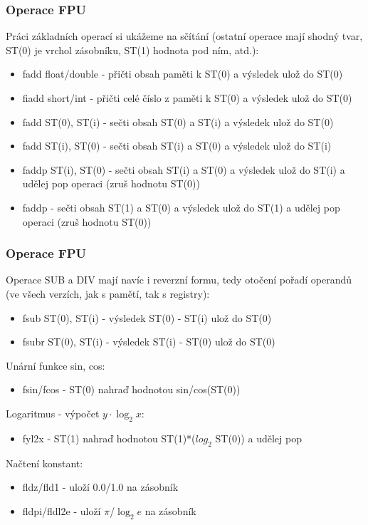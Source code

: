 \documentclass{beamer}
\begin{document}
\begin{frame}
\frametitle{Operace FPU}
Práci základních operací si ukážeme na sčítání (ostatní operace mají shodný tvar, ST(0) je vrchol zásobníku, ST(1) hodnota pod ním, atd.):
\begin{itemize}
\item fadd float/double - přičti obsah paměti k ST(0) a výsledek ulož do ST(0)
\item fiadd short/int - přičti celé číslo z paměti k ST(0) a výsledek ulož do ST(0)
\item fadd ST(0), ST(i) - sečti obsah ST(0) a ST(i) a výsledek ulož do ST(0)
\item fadd ST(i), ST(0) - sečti obsah ST(i) a ST(0) a výsledek ulož do ST(i)
\item faddp ST(i), ST(0) - sečti obsah ST(i) a ST(0) a výsledek ulož do ST(i) a udělej pop operaci (zruš hodnotu ST(0))
\item faddp - sečti obsah ST(1) a ST(0) a výsledek ulož do ST(1) a udělej pop operaci (zruš hodnotu ST(0))
\end{itemize}
\end{frame}


\begin{frame}
\frametitle{Operace FPU}
Operace SUB a DIV mají navíc i reverzní formu, tedy otočení pořadí operandů (ve všech verzích, jak s pamětí, tak s registry):
\begin{itemize}
\item fsub ST(0), ST(i) - výsledek ST(0) - ST(i) ulož do ST(0)
\item fsubr ST(0), ST(i) - výsledek ST(i) - ST(0) ulož do ST(0)
\end{itemize}

Unární funkce sin, cos:
\begin{itemize}
\item fsin/fcos - ST(0) nahraď hodnotou sin/cos(ST(0))
\end{itemize}

Logaritmus - výpočet $y\cdot\log_2 x$:
\begin{itemize}
\item fyl2x - ST(1) nahraď hodnotou ST(1)*($log_2$ ST(0)) a udělej pop
\end{itemize}

Načtení konstant:
\begin{itemize}
\item fldz/fld1 - uloží 0.0/1.0 na zásobník 
\item fldpi/fldl2e - uloží $\pi$/$\log_2 e$ na zásobník 
\end{itemize}

\end{frame}
\end{document}
